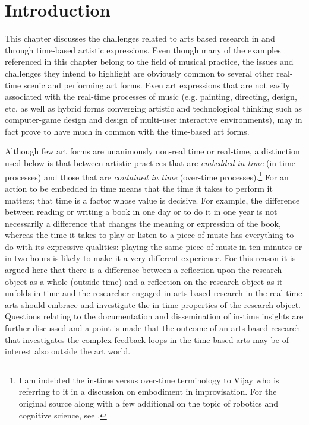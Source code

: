 \section*{Introduction}
\label{sec:introduction}

\noindent

This chapter discusses the challenges related to arts based research in and through time-based artistic expressions. Even though many of the examples referenced in this chapter belong to the field of musical practice, the issues and challenges they intend to highlight are obviously common to several other real-time scenic and performing art forms. Even art expressions that are not easily associated with the real-time processes of music (e.g. painting, directing, design, etc. as well as hybrid forms converging artistic and technological thinking such as computer-game design and design of multi-user interactive environments), may in fact prove to have much in common with the time-based art forms. 

Although few art forms are unanimously non-real time or real-time, a distinction used below is that between artistic practices that are \emph{embedded in time} (in-time processes) and those that are \emph{contained in time} (over-time processes).\footnote{I am indebted the in-time versus over-time terminology to Vijay \citet{iyer08} who is referring to it in a discussion on embodiment in improvisation. For the original source along with a few additional on the topic of robotics and cognitive science, see \citet{smithers96,smithers:98,vangelder98}.} For an action to be embedded in time means that the time it takes to perform it matters; that time is a factor whose value is decisive. For example, the difference between reading or writing a book in one day or to do it in one year is not necessarily a difference that changes the meaning or expression of the book, whereas the time it takes to play or listen to a piece of music has everything to do with its expressive qualities: playing the same piece of music in ten minutes or in two hours is likely to make it a very different experience. For this reason it is argued here that there is a difference between a reflection upon the research object as a whole (outside time) and a reflection on the research object as it unfolds in time and the researcher engaged in arts based research in the real-time arts should embrace and investigate the in-time properties of the research object. Questions relating to the documentation and dissemination of in-time insights are further discussed and a point is made that the outcome of an arts based research that investigates the complex feedback loops in the time-based arts may be of interest also outside the art world. 

